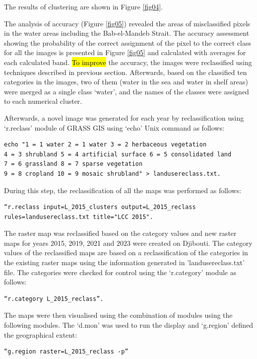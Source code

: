 \documentclass[jimaging,article,submit,pdftex,moreauthors]{Definitions/mdpi}
\begin{document}
 The results of clustering are shown in Figure \ref{fig04}.
 
The analysis of accuracy (Figure \ref{fig05}) revealed the areas of misclassified pixels in the water areas including the Bab-el-Mandeb Strait. The accuracy assessment showing the probability of the correct assignment of the pixel to the correct class for all the images is presented in Figure \ref{fig05} and calculated with averages for each calculated band. \hl{To improve} the accuracy, the images were reclassified using techniques described in previous section. Afterwards, based on the classified ten categories in the images, two of them (water in the sea and water in shelf areas) were merged as a single class ‘water’, and the names of the classes were assigned to each numerical cluster. 

Afterwards, a novel image was generated for each year by reclassification using ‘r.reclass’ module of GRASS GIS using ‘echo’ Unix command as follows: 
 \begin{verbatim}
echo "1 = 1 water 2 = 1 water 3 = 2 herbaceous vegetation 
4 = 3 shrubland 5 = 4 artificial surface 6 = 5 consolidated land 
7 = 6 grassland 8 = 7 sparse vegetation 
9 = 8 cropland 10 = 9 mosaic shrubland" > landusereclass.txt. 
\end{verbatim}
During this step, the reclassification of all the maps was performed as follows: 

 \begin{verbatim}
“r.reclass input=L_2015_clusters output=L_2015_reclass 
rules=landusereclass.txt title="LCC 2015".
\end{verbatim}

 The raster map was reclassified based on the category values and new raster maps for years 2015, 2019, 2021 and 2023 were created on Djibouti. The category values of the reclassified maps are based on a reclassification of the categories in the existing raster maps using the information generated in 'landusereclass.txt' file. The categories were checked for control using the ‘r.category’ module as follows: 
 \begin{verbatim}
“r.category L_2015_reclass”.
\end{verbatim}

The maps were then visualised using the combination of modules using the following modules. The ‘d.mon’ was used to run the display and ‘g.region’ defined the geographical extent: 
 \begin{verbatim}
“g.region raster=L_2015_reclass -p” 
\end{verbatim}
\end{document}
